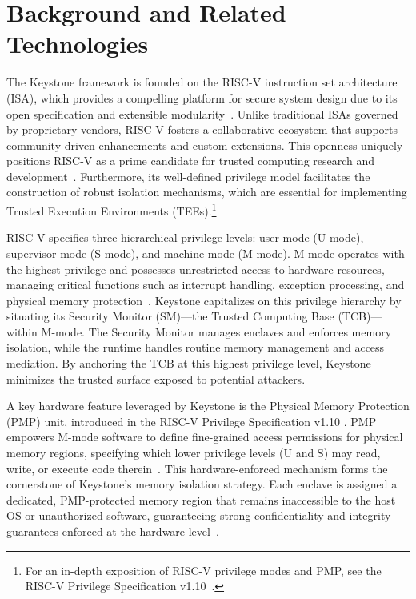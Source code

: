 \chapter{Background and Related Technologies}
\label{chap:background}

The Keystone framework is founded on the RISC-V instruction set architecture (ISA), which provides a compelling platform for secure system design due to its open specification and extensible modularity~\cite{Lee2019,Lee2019}. Unlike traditional ISAs governed by proprietary vendors, RISC-V fosters a collaborative ecosystem that supports community-driven enhancements and custom extensions. This openness uniquely positions RISC-V as a prime candidate for trusted computing research and development~\cite{Survey2023}. Furthermore, its well-defined privilege model facilitates the construction of robust isolation mechanisms, which are essential for implementing Trusted Execution Environments (TEEs).\footnote{For an in-depth exposition of RISC-V privilege modes and PMP, see the RISC-V Privilege Specification v1.10~\cite{keystone2025how}.}

RISC-V specifies three hierarchical privilege levels: user mode (U-mode), supervisor mode (S-mode), and machine mode (M-mode). M-mode operates with the highest privilege and possesses unrestricted access to hardware resources, managing critical functions such as interrupt handling, exception processing, and physical memory protection~\cite{Lee2019}. Keystone capitalizes on this privilege hierarchy by situating its Security Monitor (SM)—the Trusted Computing Base (TCB)—within M-mode. The Security Monitor manages enclaves and enforces memory isolation, while the runtime handles routine memory management and access mediation. By anchoring the TCB at this highest privilege level, Keystone minimizes the trusted surface exposed to potential attackers.

A key hardware feature leveraged by Keystone is the Physical Memory Protection (PMP) unit, introduced in the RISC-V Privilege Specification v1.10 \cite{keystone2025how}. PMP empowers M-mode software to define fine-grained access permissions for physical memory regions, specifying which lower privilege levels (U and S) may read, write, or execute code therein~\cite{keystone2025how}. This hardware-enforced mechanism forms the cornerstone of Keystone’s memory isolation strategy. Each enclave is assigned a dedicated, PMP-protected memory region that remains inaccessible to the host OS or unauthorized software, guaranteeing strong confidentiality and integrity guarantees enforced at the hardware level~\cite{Lee2019}.

